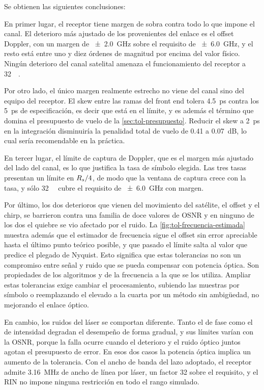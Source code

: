 Se obtienen las siguientes conclusiones:

En primer lugar, el receptor tiene margen de sobra contra todo lo que impone
el canal. El deterioro m\'as ajustado de los provenientes del enlace es el
offset Doppler, con un margen de \SI{\pm 2.0}{\giga\hertz} sobre el requisito de \SI{\pm 6.0}{\giga\hertz}, y el resto est\'a entre uno y diez
\'ordenes de magnitud por encima del valor f\'isico. Ning\'un deterioro del
canal satelital amenaza el funcionamiento del receptor a
\SI{32}{\giga\baud}.

Por otro lado, el \'unico margen realmente estrecho no viene del canal sino
del equipo del receptor. El skew entre las ramas del front end tolera
\SI{4.5}{\pico\second} contra los \SI{5}{\pico\second} de especificaci\'on, es
decir que est\'a en el l\'imite, y es adem\'as el t\'ermino que domina el
presupuesto de vuelo de la \cref{sec:tol-presupuesto}. Reducir el skew a \SI{2}{\pico\second} en la integraci\'on disminuir\'ia la penalidad total de vuelo de \num{0.41} a \SI{0.07}{\dB}, lo cual ser\'ia recomendable en la pr\'actica.

En tercer lugar, el l\'imite de captura de Doppler, que es el margen m\'as
ajustado del lado del canal, es lo que justifica la tasa de s\'imbolo elegida.
Las tres tasas presentan un l\'imite en $R_{s}/4$, de modo que la ventana de captura crece con
la tasa, y s\'olo \SI{32}{\giga\baud} cubre el requisito de
\SI{\pm 6.0}{\giga\hertz} con margen. 

Por \'ultimo, los dos deterioros que vienen del movimiento del sat\'elite, el
offset y el chirp, se barrieron contra una familia de doce valores de OSNR y
en ninguno de los dos el quiebre se vio afectado por el ruido. La
\cref{fig:tol-frecuencia-estimada} muestra adem\'as que el estimador de
frecuencia sigue el offset sin error apreciable hasta el \'ultimo punto
te\'orico posible, y que pasado el l\'imite salta al valor que predice el
plegado de Nyquist. Esto significa que estas tolerancias no son un compromiso
entre se\~nal y ruido que se pueda compensar con potencia \'optica. Son
propiedades de los algoritmos y de la frecuencia a la que se los utiliza.
Ampliar estas tolerancias exige cambiar el procesamiento, subiendo las
muestras por s\'imbolo o reemplazando el elevado a la cuarta por un m\'etodo
sin ambig\"uedad, no mejorando el enlace \'optico.

En cambio, los ruidos del l\'aser se comportan diferente. Tanto el de fase como el de
intensidad degradan el desempe\~no de forma gradual, y sus l\'imites var\'ian con la
OSNR, porque la falla ocurre cuando el deterioro y el ruido \'optico juntos
agotan el presupuesto de error. En esos dos casos la potencia \'optica implica un aumento de la tolerancia. Con el ancho de banda del lazo adoptado, el receptor admite
\SI{3.16}{\mega\hertz} de ancho de l\'inea por l\'aser, un factor \num{32}
sobre el requisito, y el RIN no impone ninguna restricci\'on en todo el rango
simulado. 

